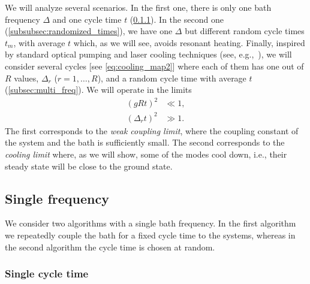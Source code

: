 \documentclass[aps,prx,twocolumn,superscriptaddress,nofootinbib,nolongbibliography,nobalancelastpage,10pt,floatfix]{revtex4-2}
\begin{document}
We will analyze several scenarios. In the first one, there is only one bath frequency $\Delta$ and one cycle time $t$ (\cref{subsec:single_time}). In the second one (\cref{subsubsec:randomized_times}), we have one $\Delta$ but different random cycle times $t_m$, with average $t$ which, as we will see, avoids resonant heating.
Finally, inspired by standard optical pumping and laser cooling techniques (see, e.g.,~\cite{Eschner2003Laser}), we will consider several cycles [see \cref{eq:cooling_map2}] where each of them has one out of $R$ values, $\Delta_r$ ($r=1,\ldots,R$), and a random cycle time with average $t$ (\cref{subsec:multi_freq}). We will operate in the limits
\begin{align}
    (g R t)^2      &\ll 1,\label{eq:weak_coupling_condition}\\
    (\Delta_r t)^2 &\gg 1.\label{eq:coolingcondition}
\end{align}
The first corresponds to the {\em weak coupling limit}, where the coupling constant of the system and the bath is sufficiently small. The second corresponds to the {\em cooling limit} where, as we will show, some of the modes cool down, i.e., their steady state will be close to the ground state.


\subsection{Single frequency}
\label{sec:single_frequency}

We consider two algorithms with a single bath frequency. In the first algorithm we repeatedly couple the bath for a fixed cycle time to the systems, whereas in the second algorithm the cycle time is chosen at random.

\subsubsection{Single cycle time}
\label{subsec:single_time}
\end{document}
